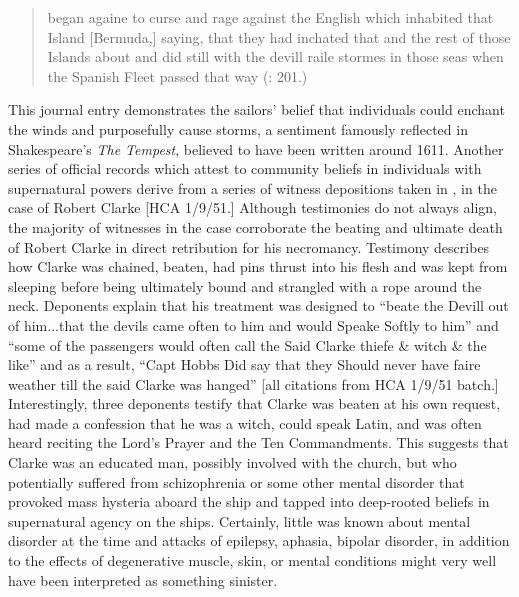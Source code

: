 \begin{quotation}
began againe to curse and rage against the English which inhabited that Island [Bermuda,] saying, that they had inchated that and the rest of those Islands about and did still with the devill raile stormes in those seas when the Spanish Fleet passed that way (\citealt{Gage1648}: 201.) 
\end{quotation}

This journal entry demonstrates the sailors’ belief that individuals could enchant the winds and purposefully cause storms, a sentiment famously reflected in Shakespeare’s \textit{The Tempest}, believed to have been written around 1611. Another series of official records which attest to community beliefs in individuals with supernatural powers derive from a series of witness depositions taken in \citealt{Virginia1661}, in the case of Robert Clarke [HCA 1/9/51.] Although testimonies do not always align, the majority of witnesses in the case corroborate the beating and ultimate death of Robert Clarke in direct retribution for his necromancy. Testimony describes how Clarke was chained, beaten, had pins thrust into his flesh and was kept from sleeping before being ultimately bound and strangled with a rope around the neck. Deponents explain that his treatment was designed to “beate the Devill out of him...that the devils came often to him and would Speake Softly to him” and “some of the passengers would often call the Said Clarke thiefe \& witch \& the like” and as a result, “Capt Hobbs Did say that they Should never have faire weather till the said Clarke was hanged” [all citations from HCA 1/9/51 batch.] Interestingly, three deponents testify that Clarke was beaten at his own request, had made a confession that he was a witch, could speak Latin, and was often heard reciting the Lord’s Prayer and the Ten Commandments. This suggests that Clarke was an educated man, possibly involved with the church, but who potentially suffered from schizophrenia or some other mental disorder that provoked mass hysteria aboard the ship and tapped into deep-rooted beliefs in supernatural agency on the ships. Certainly, little was known about mental disorder at the time and attacks of epilepsy, aphasia, bipolar disorder, in addition to the effects of degenerative muscle, skin, or mental conditions might very well have been interpreted as something sinister. 


